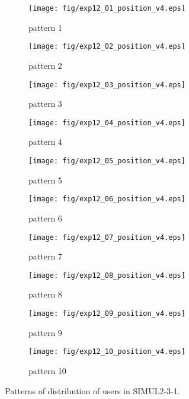 \begin{figure}
	\begin{center}
		\begin{subfigure}[b]{0.32\textwidth}
			\texttt{[image: fig/exp12\_01\_position\_v4.eps]}
			\caption{pattern 1}
			\label{figure:simul2_3_1_a}
		\end{subfigure}
		\begin{subfigure}[b]{0.32\textwidth}
			\texttt{[image: fig/exp12\_02\_position\_v4.eps]}
			\caption{pattern 2}
			\label{figure:simul2_3_1_b}
		\end{subfigure}
		\begin{subfigure}[b]{0.32\textwidth}
			\texttt{[image: fig/exp12\_03\_position\_v4.eps]}
			\caption{pattern 3}
			\label{figure:simul2_3_1_c}
		\end{subfigure}
		\begin{subfigure}[b]{0.32\textwidth}
			\texttt{[image: fig/exp12\_04\_position\_v4.eps]}
			\caption{pattern 4}
			\label{figure:simul2_3_1_d}
		\end{subfigure}
		\begin{subfigure}[b]{0.32\textwidth}
			\texttt{[image: fig/exp12\_05\_position\_v4.eps]}
			\caption{pattern 5}
			\label{figure:simul2_3_1_e}
		\end{subfigure}
		\begin{subfigure}[b]{0.32\textwidth}
			\texttt{[image: fig/exp12\_06\_position\_v4.eps]}
			\caption{pattern 6}
			\label{figure:simul2_3_1_f}
		\end{subfigure}
		\begin{subfigure}[b]{0.32\textwidth}
			\texttt{[image: fig/exp12\_07\_position\_v4.eps]}
			\caption{pattern 7}
			\label{figure:simul2_3_1_g}
		\end{subfigure}
		\begin{subfigure}[b]{0.32\textwidth}
			\texttt{[image: fig/exp12\_08\_position\_v4.eps]}
			\caption{pattern 8}
			\label{figure:simul2_3_1_h}
		\end{subfigure}
		\begin{subfigure}[b]{0.32\textwidth}
			\texttt{[image: fig/exp12\_09\_position\_v4.eps]}
			\caption{pattern 9}
			\label{figure:simul2_3_1_i}
		\end{subfigure}
		\begin{subfigure}[b]{0.32\textwidth}
			\texttt{[image: fig/exp12\_10\_position\_v4.eps]}
			\caption{pattern 10}
			\label{figure:simul2_3_1_j}
		\end{subfigure}
		\caption{Patterns of distribution of users in SIMUL2-3-1.}
		\label{figure:simul2_3_1_p}
	\end{center}
\end{figure}

